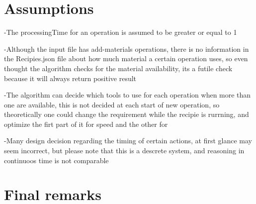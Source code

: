 \documentclass[12pt]{article}
\begin{document}
\section{Assumptions}

-The processingTime for an operation is assumed to be greater or equal to 1

-Although the input file has add-materials operations, there is no information in the Recipies.json file about how much material a certain operation uses, so even thought the algorithm checks for
the material availability, its a futile check because it will always return positive result

-The algorithm can decide which tools to use for each operation when more than one are available, this is not decided at each start of new operation, so theoretically one could change the requirement while the recipie is rurrning, and optimize the firt part of it for speed and the other for

-Many design decision regarding the timing of certain actions, at first glance may seem incorrect, but please note that this is a descrete system, and reasoning in continuoos time is not comparable

\section{Final remarks}
\end{document}
